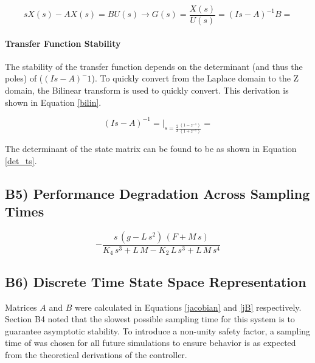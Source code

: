 \documentclass{article}
\begin{document}
\begin{equation}\label{acctf}
    sX(s)-AX(s)=BU(s)\rightarrow G(s)=\frac{X(s)}{U(s)}=(Is-A)^{-1}B= 
\end{equation}

\paragraph{Transfer Function Stability}
The stability of the transfer function depends on the determinant (and thus the poles) of ($(Is-A)^-1$). To quickly convert from the Laplace domain to the Z domain, the Bilinear transform is used to quickly convert. This derivation is shown in Equation \ref{bilin}.

\begin{equation}\label{bilin}
(Is-A)^{-1}=\left.  \right|_{s=\frac{2}{T} \frac{(1 - z^{-1})}{(1+z^{-1})}}=
\end{equation}

The determinant of the state matrix can be found to be as shown in Equation \ref{det_ts}.
\begin{equation}\label{det_ts}
    
\end{equation}



\subsection*{B5) Performance Degradation Across Sampling Times}

\begin{equation}
-\frac{s\,\left(g-L\,s^2\right)\,\left(F+M\,s\right)}{K_{4}\,s^3+L\,M-K_{2}\,L\,s^3+L\,M\,s^4}
\end{equation}



\subsection*{B6) Discrete Time State Space Representation}
Matrices $A$ and $B$ were calculated in Equations \ref{jacobian} and \ref{jB} respectively. Section B4 noted that the slowest possible sampling time for this system is to guarantee asymptotic stability. To introduce a non-unity safety factor, a sampling time of  was chosen for all future simulations to ensure behavior is as expected from the theoretical derivations of the controller.
\end{document}

